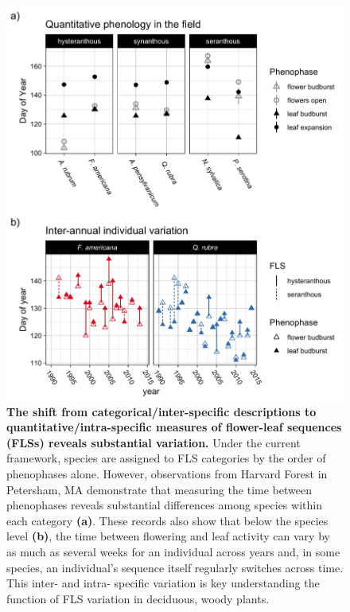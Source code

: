 \documentclass[11pt]{article}
\begin{document}
 \begin{figure}[h!]
        \centering
          \includegraphics[width=\textwidth]{..//HarvardForest/FLS_viz.jpeg}
          \caption{\textbf{The shift from categorical/inter-specific descriptions to quantitative/intra-specific measures of flower-leaf sequences (FLSs) reveals substantial variation.} Under the current framework, species are assigned to FLS categories by the order of phenophases alone. However, observations from Harvard Forest in Petersham, MA demonstrate that measuring the time between phenophases reveals substantial differences among species within each category \textbf{(a)}. These records also show that below the species level \textbf{(b)}, the time between flowering and leaf activity can vary by as much as several weeks for an individual across years and, in some species, an individual's sequence itself regularly switches across time. This inter- and intra- specific variation is key understanding the function of FLS variation in deciduous, woody plants.}
        \label{fig:vizzy}
    \end{figure}

\pagebreak  
\end{document}
